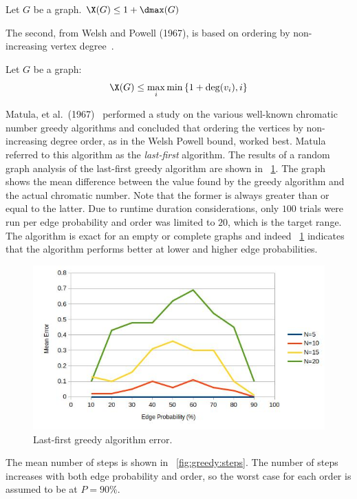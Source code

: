 \begin{theorem}
  \label{thm:upper}
  Let \(G\) be a graph.  \(\X(G)\le1+\dmax(G)\)
\end{theorem}

The second, from Welsh and Powell (1967), is based on ordering by non-increasing vertex degree~\cite{welsh}.

\begin{theorem}
  \label{thm:welsh}
  Let \(G\) be a graph:
  \[\X(G)\le\max_i\min\left\{1+\deg(v_i),i\right\}\]
\end{theorem}

Matula, et al.~(1967)~\cite{matula} performed a study on the various well-known chromatic number greedy algorithms
and concluded that ordering the vertices by non-increasing degree order, as in the Welsh Powell bound, worked best.
Matula referred to this algorithm as the \emph{last-first} algorithm.  The results of a random graph analysis of
the last-first greedy algorithm are shown in \figurename~\ref{fig:greedy:error}.  The graph shows the mean
difference between the value found by the greedy algorithm and the actual chromatic number.  Note that the former
is always greater than or equal to the latter.  Due to runtime duration considerations, only \(100\) trials were
run per edge probability and order was limited to \(20\), which is the target range.  The algorithm is exact for an
empty or complete graphs and indeed \figurename~\ref{fig:greedy:error} indicates that the algorithm performs better
at lower and higher edge probabilities.

\begin{figure}[H]
  \centering
  \includegraphics[width=5in]{greedy_error}
  \caption{Last-first greedy algorithm error.}
  \label{fig:greedy:error}
\end{figure}

The mean number of steps is shown in \figurename~\ref{fig:greedy:steps}.  The number of steps increases with both
edge probability and order, so the worst case for each order is assumed to be at \(P=90\%\).

